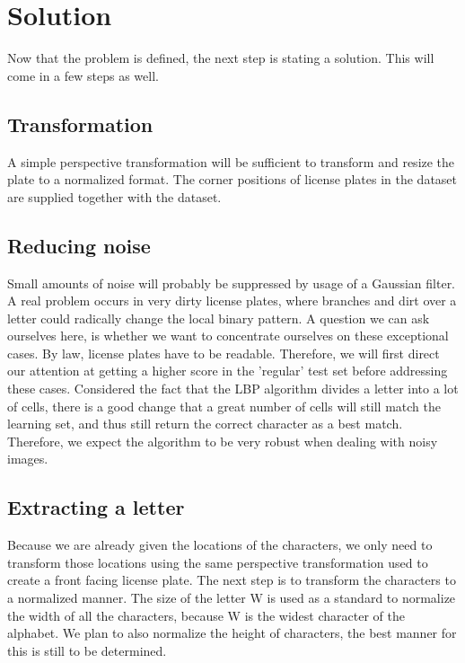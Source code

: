 \documentclass[a4paper]{article}
\begin{document}
\section{Solution}

Now that the problem is defined, the next step is stating a solution. This will
come in a few steps as well.

\subsection{Transformation}

A simple perspective transformation will be sufficient to transform and resize
the plate to a normalized format. The corner positions of license plates in the
dataset are supplied together with the dataset.

\subsection{Reducing noise}

Small amounts of noise will probably be suppressed by usage of a Gaussian
filter. A real problem occurs in very dirty license plates, where branches and
dirt over a letter could radically change the local binary pattern. A question
we can ask ourselves here, is whether we want to concentrate ourselves on these
exceptional cases. By law, license plates have to be readable. Therefore, we
will first direct our attention at getting a higher score in the 'regular' test
set before addressing these cases. Considered the fact that the LBP algorithm
divides a letter into a lot of cells, there is a good change that a great
number of cells will still match the learning set, and thus still return the
correct character as a best match. Therefore, we expect the algorithm to be
very robust when dealing with noisy images.

\subsection{Extracting a letter}

Because we are already given the locations of the characters, we only need to
transform those locations using the same perspective transformation used to
create a front facing license plate. The next step is to transform the
characters to a normalized manner. The size of the letter W is used as a
standard to normalize the width of all the characters, because W is the widest
character of the alphabet. We plan to also normalize the height of characters,
the best manner for this is still to be determined.
\end{document}
